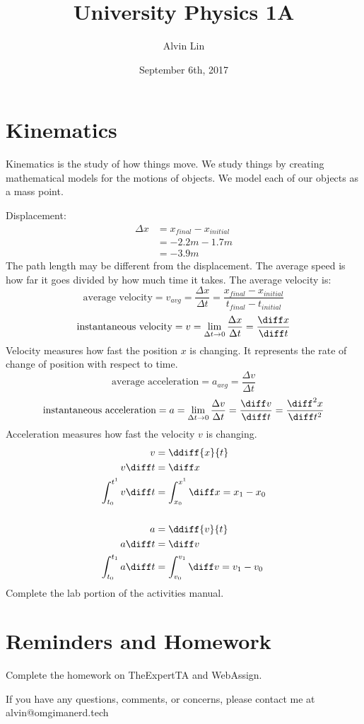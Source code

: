 \documentclass[letterpaper, 12pt]{math}
\title{University Physics 1A}
\author{Alvin Lin}
\date{September 6th, 2017}
\begin{document}
\maketitle

\section*{Kinematics}
Kinematics is the study of how things move. We study things by creating
mathematical models for the motions of objects. We model each of our objects
as a mass point.
\begin{center}
\end{center}
Displacement:
\begin{align*}
  \Delta x &= x_{final}-x_{initial} \\
  &= -2.2m-1.7m \\
  &= -3.9m
\end{align*}
The path length may be different from the displacement. The average speed is
how far it goes divided by how much time it takes. The average velocity is:
\[ \text{average velocity} = v_{avg} = \frac{\Delta x}{\Delta t} =
  \frac{x_{final}-x_{initial}}{t_{final}-t_{initial}} \]
\[ \text{instantaneous velocity} = v = \lim_{\Delta t\to0}\frac{\Delta x}
  {\Delta t} = \frac{\diff x}{\diff t} \]
Velocity measures how fast the position \( x \) is changing. It represents the
rate of change of position with respect to time.
\[ \text{average acceleration} = a_{avg} = \frac{\Delta v}{\Delta t} \]
\[ \text{instantaneous acceleration} = a = \lim_{\Delta t\to0}\frac{\Delta v}
  {\Delta t} = \frac{\diff v}{\diff t} = \frac{\diff^2 x}{\diff t^2} \]
Acceleration measures how fast the velocity \( v \) is changing.
\begin{align*}
  v &= \ddiff{x}{t} \\
  v\diff t &= \diff x \\
  \int_{t_0}^{t^1}v\diff t &= \int_{x_0}^{x^1}\diff x = x_1-x_0 \\ \\
  a &= \ddiff{v}{t} \\
  a\diff t &= \diff v \\
  \int_{t_0}^{t_1}a\diff t &= \int_{v_0}^{v_1}\diff v = v_1-v_0
\end{align*}
Complete the lab portion of the activities manual.

\section*{Reminders and Homework}
Complete the homework on TheExpertTA and WebAssign.

\begin{center}
  If you have any questions, comments, or concerns, please contact me at
  alvin@omgimanerd.tech
\end{center}
\end{document}
